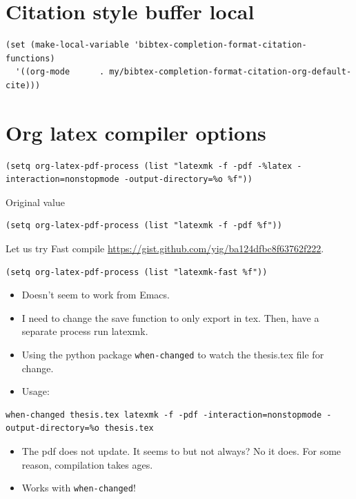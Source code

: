 \documentclass[letterpaper, 12pt]{report}
\begin{document}
\section{Citation style buffer local}
\label{sec:org97a37f4}

\begin{verbatim}
(set (make-local-variable 'bibtex-completion-format-citation-functions)
  '((org-mode      . my/bibtex-completion-format-citation-org-default-cite)))
\end{verbatim}
\section{Org latex compiler options}
\label{sec:orgc7e24c0}

\begin{verbatim}
(setq org-latex-pdf-process (list "latexmk -f -pdf -%latex -interaction=nonstopmode -output-directory=%o %f"))
\end{verbatim}

Original value

\begin{verbatim}
(setq org-latex-pdf-process (list "latexmk -f -pdf %f"))
\end{verbatim}

Let us try Fast compile \url{https://gist.github.com/yig/ba124dfbc8f63762f222}.

\begin{verbatim}
(setq org-latex-pdf-process (list "latexmk-fast %f"))
\end{verbatim}

\begin{itemize}
\item Doesn't seem to work from Emacs.
\item I need to change the save function to only export in tex. Then, have a separate process run latexmk.
\item Using the python package \texttt{when-changed} to watch the thesis.tex file for change.
\item Usage:
\end{itemize}

\begin{verbatim}
when-changed thesis.tex latexmk -f -pdf -interaction=nonstopmode -output-directory=%o thesis.tex
\end{verbatim}

\begin{itemize}
\item The pdf does not update. It seems to but not always? No it does. For some reason, compilation takes ages.
\item Works with \texttt{when-changed}!
\end{itemize}
\end{document}

